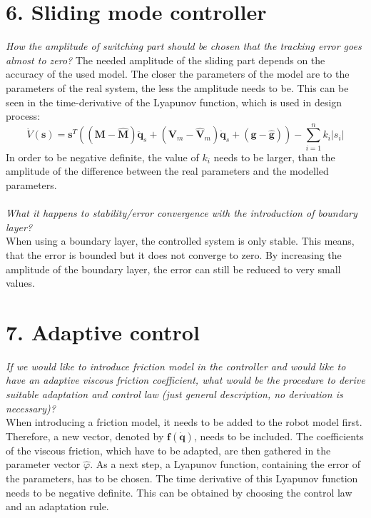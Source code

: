\section*{6. Sliding mode controller}
\textit{How the amplitude of switching part should be chosen that the tracking error goes almost to zero?}
The needed amplitude of the sliding part depends on the accuracy of the used model. The closer the parameters of the model are to the parameters of the real system, the less the amplitude needs to be. This can be seen in the time-derivative of the Lyapunov function, which is used in design process:
\begin{equation*}
	\dot{V}(\mathbf{s}) = \mathbf{s}^T((\mathbf{M}-\mathbf{\hat{M}})\mathbf{\ddot{q}}_s+(\mathbf{V}_m-\mathbf{\hat{V}}_m)\mathbf{\dot{q}}_s + (\mathbf{g}-\mathbf{\hat{g}})) - \sum\limits_{i=1}^{n}k_i|s_i|
\end{equation*}
In order to be negative definite, the value of $k_i$ needs to be larger, than the amplitude of the difference between the real parameters and the modelled parameters.\\\\
\textit{What it happens to stability/error convergence with the introduction of boundary layer?}\\
When using a boundary layer, the controlled system is only stable. This means, that the error is bounded but it does not converge to zero. By increasing the amplitude of the boundary layer, the error can still be reduced to very small values.
\section*{7. Adaptive control}
\textit{If we would like to introduce friction model in the controller and would like to have an adaptive viscous friction coefficient, what would be the procedure to derive suitable adaptation and control law (just general description, no derivation is necessary)?}\\
When introducing a friction model, it needs to be added to the robot model first. Therefore, a new vector, denoted by $\mathbf{f}(\mathbf{\dot{q}})$, needs to be included. The coefficients of the viscous friction, which have to be adapted, are then gathered in the parameter vector $\hat{\varphi}$. As a next step, a Lyapunov function, containing the error of the parameters, has to be chosen. The time derivative of this Lyapunov function needs to be negative definite. This can be obtained by choosing the control law and an adaptation rule.